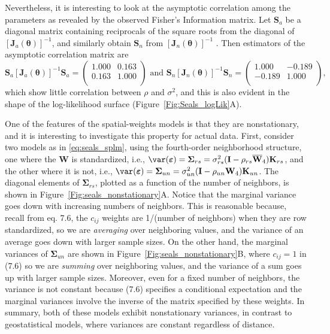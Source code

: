 \documentclass[12pt, titlepage]{article}
\begin{document}
Nevertheless, it is interesting to look at the asymptotic correlation among the parameters as revealed by the observed Fisher's Information matrix.  Let $\mathbf{S}_{a}$ be a diagonal matrix containing reciprocals of the square roots from the diagonal of $[\boldsymbol{J}_{a}{(\boldsymbol{\theta})}]^{-1}$, and similarly obtain $\mathbf{S}_{n}$ from $[\boldsymbol{J}_{n}{(\boldsymbol{\theta})}]^{-1}$ .  Then estimators of the asymptotic correlation matrix are
$$
\mathbf{S}_{a}[\boldsymbol{J}_{a}{(\boldsymbol{\theta})}]^{-1}\mathbf{S}_{a} =
\left(
\begin{array}{rr}
1.000 & 0.163 \\ 
  0.163 & 1.000  \\ 
\end{array}
\right) \textrm{ and }
\mathbf{S}_{n}[\boldsymbol{J}_{n}{(\boldsymbol{\theta})}]^{-1}\mathbf{S}_{n} =
\left(
\begin{array}{rr}
1.000 & -0.189 \\ 
  -0.189 & 1.000  \\ 
\end{array}
\right),
$$
which show little correlation between $\rho$ and $\sigma^{2}$, and this is also evident in the shape of the log-likelihood surface (Figure~\ref{Fig:Seals_logLik}A).
 
One of the features of the spatial-weights models is that they are nonstationary, and it is interesting to investigate this property for actual data.  First, consider two models as in \eqref{eq:seals_splm}, using the fourth-order neighborhood structure, one where the $\mathbf{W}$ is standardized, i.e., $\var(\boldsymbol{\varepsilon}) = \boldsymbol{\Sigma}_{rs} = \sigma^{2}_{rs}(\mathbf{I} - \rho_{rs}\overline{\mathbf{W}}_{4})\mathbf{K}_{rs}$, and the other where it is not, i.e., $\var(\boldsymbol{\varepsilon}) = \boldsymbol{\Sigma}_{un} = \sigma^{2}_{un}(\mathbf{I} - \rho_{un}\mathbf{W}_{4})\mathbf{K}_{un}$. The diagonal elements of $\boldsymbol{\Sigma}_{rs}$, plotted as a function of the number of neighbors, is shown in Figure~\ref{Fig:seals_nonstationary}A.  Notice that the marginal variance goes down with increasing numbers of neighbors.  This is reasonable because, recall from eq. 7.6, the $c_{ij}$ weights are 1/(number of neighbors) when they are row standardized, so we are \textit{averaging} over neighboring values, and the variance of an average goes down with larger sample sizes.  On the other hand, the marginal variances of $\boldsymbol{\Sigma}_{un}$ are shown in Figure~\ref{Fig:seals_nonstationary}B, where $c_{ij} = 1$ in (7.6) so we are \textit{summing} over neighboring values, and the variance of a sum goes up with larger sample sizes.  Moreover, even for a fixed number of neighbors, the variance is not constant because (7.6) specifies a conditional expectation and the marginal variances involve the inverse of the matrix specified by these weights. In summary, both of these models exhibit nonstationary variances, in contrast to geostatistical models, where variances are constant regardless of distance.
\end{document}
